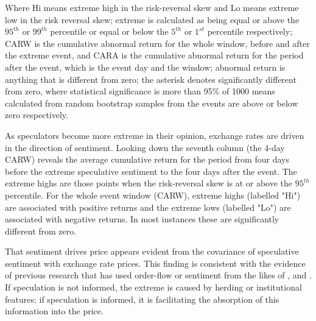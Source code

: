 \documentclass[ijfs,article,submit,oneauthor,pdftex,10pt,a4paper]{mdpi}
\begin{document}
{\begin{sidewaystable}
\begin{threeparttable}
\begin{tablenotes}
\small 
\item Where Hi means extreme high in the risk-reversal skew and Lo means extreme low in the risk reversal skew; extreme is calculated as being equal or above the $95^{th}$ or $99^{th}$ percentile or equal or below the $5^{th}$ or $1^{st}$ percentile respectively; CARW is the cumulative abnormal return for the whole window, before and after the extreme event, and CARA is the cumulative abnormal return for the period after the event, which is the event day and the window; abnormal return is anything that is different from zero; the asterisk denotes significantly different from zero, where statistical significance is more than 95\% of 1000 means calculated from random bootstrap samples from the events are above or below zero respectively.   
\end{tablenotes}
\end{threeparttable}  
\end{sidewaystable}

As speculators become more extreme in their opinion, exchange rates are driven in the direction of sentiment. Looking down the seventh column (the 4-day CARW) reveals the average cumulative return for the period from four days before the extreme speculative sentiment to the four days after the event.   The extreme highs are those points when the risk-reversal skew is at or above the $95^{th}$ percentile.  For the whole event window (CARW), extreme highs (labelled "Hi") are associated with positive returns and the extreme lows (labelled "Lo") are associated with negative returns. In most instances these are significantly different from zero.  

That sentiment drives price appears evident from the covariance of speculative sentiment with exchange rate prices. This finding is consistent with the evidence of previous research that has used order-flow or sentiment from the likes of \citet{Evans2002Order}, \citet{FuturesSanders} and \citet{FuturesWang}. If speculation is not informed, the extreme is caused by herding or institutional features; if speculation is informed, it is facilitating the absorption of this information into the price. 

}
\end{document}
